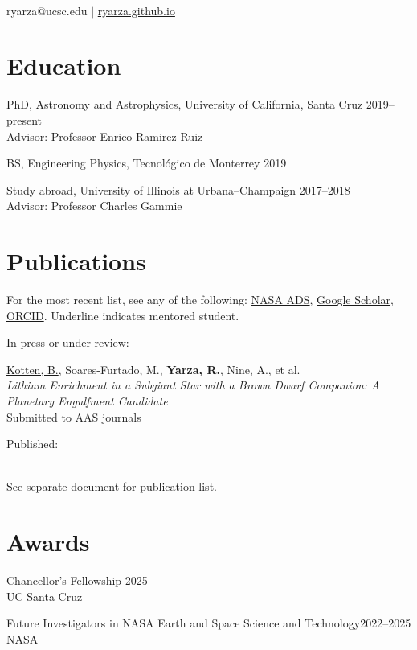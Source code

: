 \documentclass[12pt]{article}
\begin{document}
{\\\vspace{0.5em}
ryarza@ucsc.edu \(|\) \href{https://ryarza.github.io}{ryarza.github.io}

}
\section{Education}
PhD, Astronomy and Astrophysics, University of California, Santa Cruz \hfill 2019--present\\
Advisor: Professor Enrico Ramirez-Ruiz

BS, Engineering Physics, Tecnol\'{o}gico de Monterrey \hfill 2019

Study abroad, University of Illinois at Urbana--Champaign \hfill 2017--2018\\%
Advisor: Professor Charles Gammie

\section{Publications}
For the most recent list, see any of the following: \href{\adslibrary}{NASA ADS}, \href{\googlescholar}{Google Scholar}, \href{https://orcid.org/0000-0003-0381-1039}{ORCID}.
\ifdefined\withpapers{}
Underline indicates mentored student.

\ifdefined\withunpublished{}
In press or under review:
\begin{etaremune}
\item \underline{Kotten, B.}, Soares-Furtado, M., \textbf{Yarza, R.}, Nine, A., et al.\\\textit{Lithium Enrichment in a Subgiant Star with a Brown Dwarf Companion: A Planetary Engulfment Candidate}\\Submitted to AAS journals

\end{etaremune}
Published:
\else\fi
\begin{etaremune}

\end{etaremune}
\else
\\See separate document for publication list.
\fi

\section{Awards}
Chancellor's Fellowship \hfill 2025\\
UC Santa Cruz

Future Investigators in NASA Earth and Space Science and Technology\hfill 2022--2025\\
NASA
\end{document}
